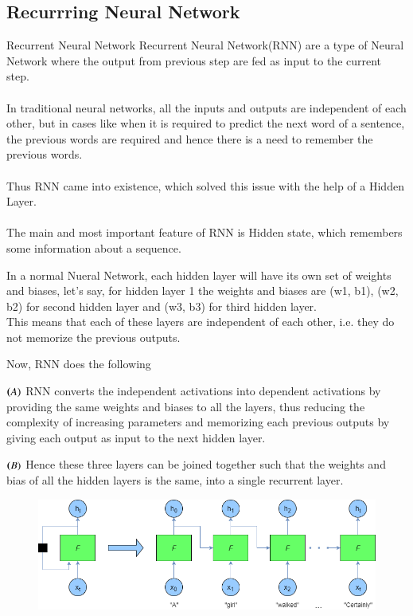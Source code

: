\documentclass{if-beamer}
\begin{document}
\subsection{Recurrring Neural Network}
\begin{frame}{Recurrent Neural Network}
Recurrent Neural Network(RNN) are a type of Neural Network where the output from previous step are fed as input to the current step. \\ \text{ }
\\In traditional neural networks, all the inputs and outputs are independent of each other, but in cases like when it is required to predict the next word of a sentence, the previous words are required and hence there is a need to remember the previous words. \\ \text{}
\\Thus RNN came into existence, which solved this issue with the help of a Hidden Layer.\\  \text{}
\\The main and most important feature of RNN is Hidden state, which remembers some information about a sequence.
\end{frame}
\begin{frame}
In a normal Nueral Network, each hidden layer will have its own set of weights and biases, let’s say, for hidden layer 1 the weights and biases are (w1, b1), (w2, b2) for second hidden layer and (w3, b3) for third hidden layer. \\This means that each of these layers are independent of each other, i.e. they do not memorize the previous outputs.\\ \text{}



Now, RNN does the following 
\begin{list}
    
    \item  $\textbf(A)$ RNN converts the independent activations into dependent activations by providing the same weights and biases to all the layers, thus reducing the complexity of increasing parameters and memorizing each previous outputs by giving each output as input to the next hidden layer.
    \item $\textbf(B)$ Hence these three layers can be joined together such that the weights and bias of all the hidden layers is the same, into a single recurrent layer.
\begin{figure}
\centering
\includegraphics[width=0.8\columnwidth]{RNN.png}
\label{fig:FinalPres1}
\end{figure}
    
\end{list}
\end{frame}
\end{document}
